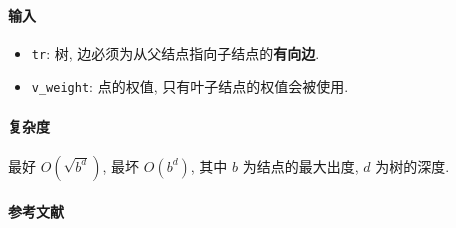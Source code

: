\paragraph{输入}

\begin{itemize}
    \item \verb|tr|: 树, 边必须为从父结点指向子结点的\textbf{有向边}.
    \item \verb|v_weight|: 点的权值, 只有叶子结点的权值会被使用.
\end{itemize}

\paragraph{复杂度}

最好 \(O\left(\sqrt{b^d}\right)\), 最坏 \(O\left(b^d\right)\), 其中 \(b\) 为结点的最大出度, \(d\) 为树的深度.

\paragraph{参考文献}

\cite{enwiki:1188156145}
